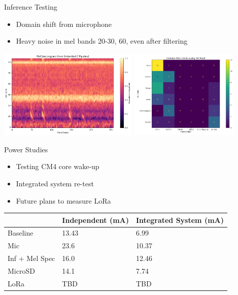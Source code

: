 \begin{frame}{Inference Testing}
    \begin{itemize}
        \item Domain shift from microphone 
        \item Heavy noise in mel bands 20-30, 60, even after filtering
    \end{itemize}
    \includegraphics[height=0.7\textheight,width=0.5\textwidth,keepaspectratio]{images/melSpec.png}
    \includegraphics[height=0.7\textheight,width=0.39\textwidth,keepaspectratio]{images/confusionMatrix.png}
\end{frame}

\begin{frame}{Power Studies}
    \begin{itemize}
        \item Testing CM4 core wake-up
        \item Integrated system re-test
        \item Future plans to measure LoRa
    \end{itemize}
    \begin{table}[]
    \begin{tabular}{lll}
    \hline
                & Independent (mA) & Integrated System (mA) \\ \hline
    Baseline       & 13.43            & 6.99                  \\
    Mic            & 23.6             & 10.37                 \\
    Inf + Mel Spec & 16.0             & 12.46                 \\
    MicroSD        & 14.1             & 7.74                  \\
    LoRa          & TBD              & TBD                     \\ \hline
    \end{tabular}
    \end{table}
\end{frame}

